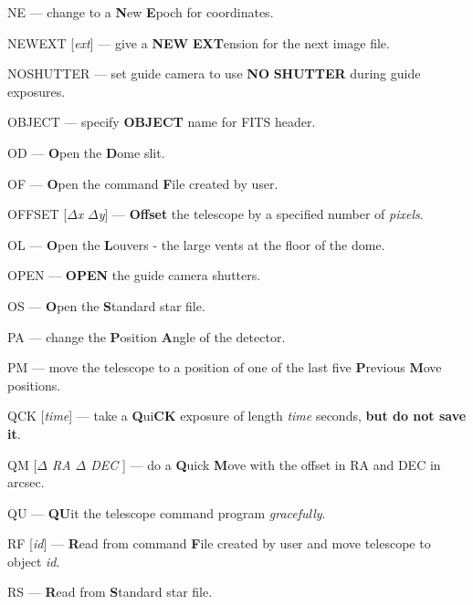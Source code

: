 \begin{itemize}
\item{{NE} --- change to a {\bf N}ew {\bf E}poch for coordinates.
\item{{NEWEXT [\it ext}]} --- give a {\bf NEW} {\bf EXT}ension for the next image file.}
\item{{NOSHUTTER} --- set guide camera to use {\bf NO} {\bf SHUTTER} during guide exposures.} 

\item{{OBJECT} --- specify {\bf OBJECT} name for FITS header.}
\item{{OD} --- {\bf O}pen the {\bf D}ome slit.}
\item{{OF} --- {\bf O}pen the command {\bf F}ile created by user.}
\item{{OFFSET [$\Delta${\it x} $\Delta${\it y}]} --- {\bf Offset} the telescope  by a specified number of \textit{pixels}.}
\item{{OL} --- {\bf O}pen the {\bf L}ouvers - the large vents at the floor of the dome.}
\item{{OPEN} --- {\bf OPEN} the guide camera shutters.}
\item{{OS} --- {\bf O}pen the {\bf S}tandard star file.}

\item{{PA} --- change the {\bf P}osition {\bf A}ngle of the detector.}
\item{{PM} --- move the telescope to a position of one of the last five
{\bf P}revious {\bf M}ove positions.}

\item{{QCK [{\it time}]} --- take a {\bf Q}ui{\bf CK} exposure of 
length {\it time} seconds, \textbf{but do not save it}.}
\item{{QM [{\it $\Delta$ RA $\Delta$ DEC }]} --- do a {\bf Q}uick {\bf M}ove with the offset in RA and DEC in arcsec.}
\item{{QU} --- {\bf QU}it the telescope command program {\it gracefully}.}

\item{{RF [{\it id}]} --- {\bf R}ead from command {\bf F}ile created by user and move telescope to object {\it id}.}
\item{{RS} --- {\bf R}ead from {\bf S}tandard star file.}


\end{itemize}
